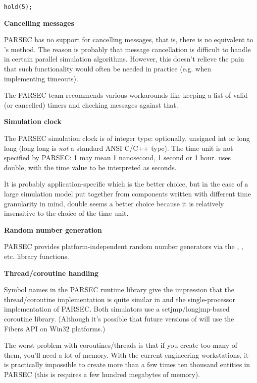 \begin{Verbatim}
hold(5);
\end{Verbatim}

\textbf{Cancelling messages}


PARSEC has no support for cancelling messages, that is, there 
is no equivalent to {\opp}'s  method. The reason 
is probably that message cancellation is difficult to handle 
in certain parallel simulation algorithms. However, this doesn't 
relieve the pain that such functionality would often be needed 
in practice (e.g. when implementing timeouts).


The PARSEC team recommends various workarounds like keeping a 
list of valid (or cancelled) timers and checking messages against 
that.


\textbf{Simulation clock}


The PARSEC simulation clock is of integer type: optionally, unsigned 
int or long long (long long is \textit{not} a standard ANSI C/C++ type). 
The time unit is not specified by PARSEC: 1 may mean 1 nanosecond, 
1 second or 1 hour. {\opp} uses double, with the time value 
to be interpreted as seconds.

It is probably application-specific which is the better choice, 
but in the case of a large simulation model put together from 
components written with different time granularity in mind, double 
seems a better choice because it is relatively insensitive to 
the choice of the time unit.


\textbf{Random number generation}


PARSEC provides platform-independent random number generators 
via the , , etc. library functions.


\textbf{Thread/coroutine handling}


Symbol names in the PARSEC runtime library give the impression 
that the thread/coroutine implementation is quite similar in 
{\opp} and the single-processor implementation of PARSEC. Both 
simulators use a setjmp/longjmp-based coroutine library. (Although 
it's possible that future versions of {\opp} will use the Fibers 
API on Win32 platforms.)


The worst problem with coroutines/threads is that if you create 
too many of them, you'll need a lot of memory. With the current 
engineering workstations, it is practically impossible to create 
more than a few times ten thousand entities in PARSEC (this is 
requires a few hundred megabytes of memory).

